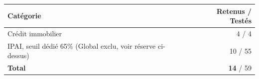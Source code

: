 \documentclass[11pt,a4paper]{article}
\begin{document}
\begin{center}
\begin{tabular}{lr}
\toprule
\textbf{Catégorie} & \textbf{Retenus / Testés} \\
\midrule
Crédit immobilier & 4 / 4 \\
IPAI, seuil dédié 65\% (Global exclu, voir réserve ci-dessus) & 10 / 55 \\
\midrule
\textbf{Total} & \textbf{14} / 59\\
\bottomrule
\end{tabular}
\end{center}
\end{document}
